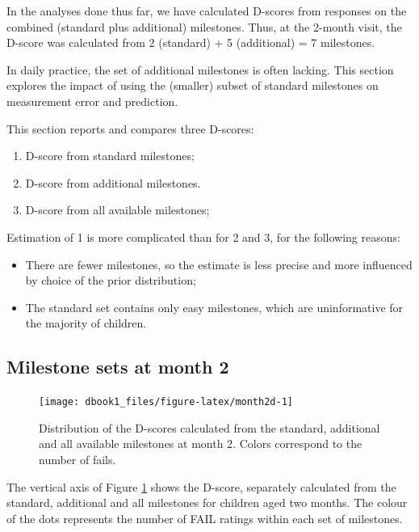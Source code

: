 \documentclass[
]{book}
\providecommand{\tightlist}{%
  \setlength{\itemsep}{0pt}\setlength{\parskip}{0pt}}
\begin{document}
In the analyses done thus far, we have calculated D-scores from responses on the combined (standard plus additional) milestones. Thus, at the 2-month visit, the D-score was calculated from 2 (standard) + 5 (additional) = 7 milestones.

In daily practice, the set of additional milestones is often lacking. This section explores the impact of using the (smaller) subset of standard milestones on measurement error and prediction.

This section reports and compares three D-scores:

\begin{enumerate}
\def\labelenumi{\arabic{enumi}.}
\tightlist
\item
  D-score from standard milestones;
\item
  D-score from additional milestones.
\item
  D-score from all available milestones;
\end{enumerate}

Estimation of 1 is more complicated than for 2 and 3, for the following reasons:

\begin{itemize}
\item
  There are fewer milestones, so the estimate is less precise and more influenced by choice of the prior distribution;
\item
  The standard set contains only easy milestones, which are uninformative for the majority of children.
\end{itemize}

\hypertarget{milestone-sets-at-month-2}{%
\subsection{Milestone sets at month 2}\label{milestone-sets-at-month-2}}

\begin{figure}

{\centering \texttt{[image: dbook1\_files/figure-latex/month2d-1]} 

}

\caption{Distribution of the D-scores calculated from the standard, additional and all available milestones at month 2. Colors correspond to the number of fails.}\label{fig:month2d}
\end{figure}



The vertical axis of Figure \ref{fig:month2d} shows the D-score, separately calculated from the standard, additional and all milestones for children aged two months. The colour of the dots represents the number of FAIL ratings within each set of milestones.
\end{document}
